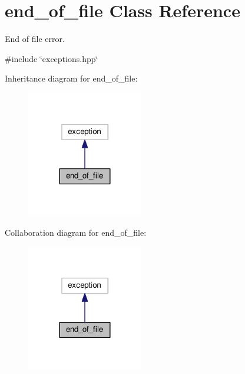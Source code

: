 \hypertarget{classend__of__file}{}\section{end\+\_\+of\+\_\+file Class Reference}
\label{classend__of__file}


End of file error.  




{\ttfamily \#include \char`\"{}exceptions.\+hpp\char`\"{}}



Inheritance diagram for end\+\_\+of\+\_\+file\+:\nopagebreak
\begin{figure}[H]
\begin{center}
\leavevmode
\includegraphics[width=144pt]{classend__of__file__inherit__graph}
\end{center}
\end{figure}


Collaboration diagram for end\+\_\+of\+\_\+file\+:\nopagebreak
\begin{figure}[H]
\begin{center}
\leavevmode
\includegraphics[width=144pt]{classend__of__file__coll__graph}
\end{center}
\end{figure}
